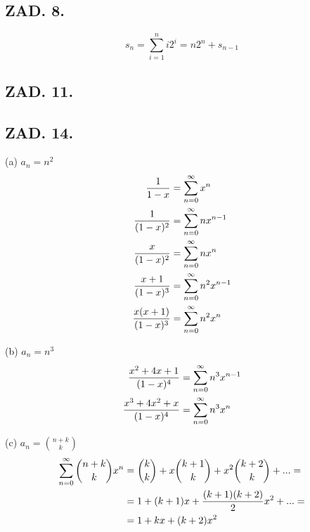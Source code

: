 \documentclass{article}[13pt]
\begin{document}
\subsection*{ZAD. 8.}

$$s_n=\sum\limits_{i=1}^ni2^i=n2^n+s_{n-1}$$

\subsection*{ZAD. 11.}



\subsection*{ZAD. 14.}

{\color{acc}(a)} $a_n=n^2$
\begin{align*}
    {1\over 1-x}&=\sum\limits_{n=0}^\infty x^n\\
    {1\over(1-x)^2}&=\sum\limits_{n=0}^\infty nx^{n-1}\\
    {x\over(1-x)^2}&=\sum\limits_{n=0}^\infty nx^n\\
    {x+1\over(1-x)^3}&=\sum\limits_{n=0}^\infty n^2x^{n-1}\\
    {x(x+1)\over(1-x)^3}&=\sum\limits_{n=0}^\infty n^2x^n
\end{align*}

{\color{acc}(b)} $a_n=n^3$
\begin{align*}
    {x^2+4x+1\over(1-x)^4}&=\sum\limits_{n=0}^\infty n^3x^{n-1}\\
    {x^3+4x^2+x\over (1-x)^4}&=\sum\limits_{n=0}^\infty n^3x^n
\end{align*}

{\color{acc}(c)} $a_n={n+k\choose k}$
\begin{align*}
    \sum\limits_{n=0}^\infty {n+k\choose k}x^n&={k\choose k}+x{k+1\choose k}+x^2{k+2\choose k}+...=\\
    &=1+(k+1)x+{(k+1)(k+2)\over 2}x^2+...=\\
    &=1+kx+(k+2)x^2
\end{align*}
\end{document}

